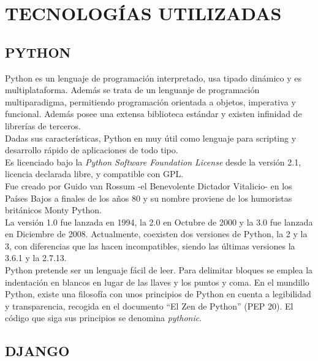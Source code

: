 \section{TECNOLOGÍAS UTILIZADAS} 
\label{sec:tec_use}

\subsection{PYTHON} 
\label{sec:python}


Python es un lenguaje de programación interpretado, usa tipado dinámico y es multiplataforma. Además se trata de un lenguanje de programación multiparadigma, permitiendo programación orientada a objetos, imperativa y funcional. Además posee una extensa biblioteca estándar y existen infinidad de librerías de terceros.\\


Dadas sus características, Python en muy útil como lenguaje para scripting y desarrollo rápido de aplicaciones de todo tipo.\\


Es licenciado bajo la \textit{Python Software Foundation License} desde la versión 2.1, licencia declarada libre, y compatible con GPL.\\


Fue creado por Guido van Rossum -el Benevolente Dictador Vitalicio- en los Países Bajos a finales de los años 80 y su nombre proviene de los humoristas británicos Monty Python.\\


La versión 1.0 fue lanzada en 1994, la 2.0 en Octubre de 2000 y la 3.0 fue lanzada en Diciembre de 2008. Actualmente, coexisten dos versiones de Python, la 2 y la 3, con diferencias que las hacen incompatibles, siendo las últimas versiones la 3.6.1 y la 2.7.13.\\


Python pretende ser un lenguaje fácil de leer. Para delimitar bloques se emplea la indentación en blancos en lugar de las llaves y los puntos y coma. En el mundillo Python, existe una filosofía  con unos principios de Python en cuenta a legibilidad y transparencia, recogida en el documento ``El Zen de Python'' (PEP 20). El código que siga sus principios se denomina \textit{pythonic}.


\subsection{DJANGO} 
\label{sec:django}


